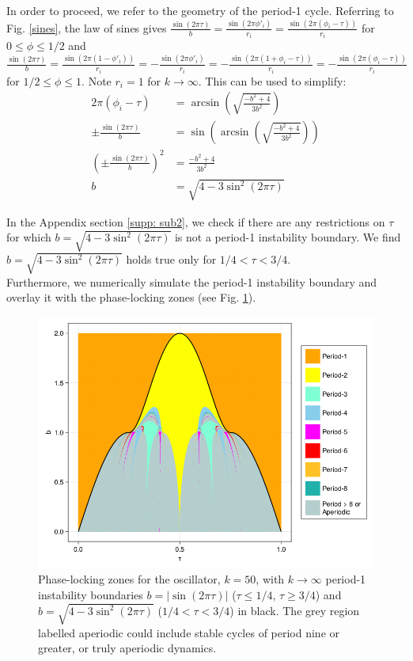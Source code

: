 \indent In order to proceed, we refer to the geometry of the period-1 cycle. Referring to Fig. \ref{sines}, the law of sines gives $\frac{\sin(2\pi \tau)}{b}=\frac{\sin(2\pi \phi'_i)}{r_i}=\frac{\sin(2\pi (\phi_i -\tau))}{r_i}$ for $0\leq \phi \leq1/2$ and $\frac{\sin(2\pi \tau)}{b}=\frac{\sin(2\pi (1-\phi'_i))}{r_i}=-\frac{\sin(2\pi \phi'_i)}{r_i}=-\frac{\sin(2\pi (1+\phi_i-\tau))}{r_i}=-\frac{\sin(2\pi (\phi_i-\tau))}{r_i}$ for $1/2\leq \phi \leq1$. Note $r_i=1$ for $k\rightarrow \infty$. This can be used to simplify:
\begin{align}
    2\pi(\phi_i - \tau) &= \arcsin(\sqrt{\frac{-b^2+4}{3b^2}}) \nonumber \\
    \pm\frac{\sin(2\pi \tau)}{b} &= \sin(\arcsin(\sqrt{\frac{-b^2+4}{3b^2}}))\nonumber \\
    (\pm\frac{\sin(2\pi \tau)}{b})^2 &= \frac{-b^2+4}{3b^2} \nonumber \\
    b &= \sqrt{4-3\sin^2(2\pi\tau)} 
    \label{eq:bound2}
\end{align}

In the Appendix section \ref{supp: sub2}, we check if there are any restrictions on $\tau$ for which $b = \sqrt{4-3\sin^2(2\pi\tau)}$ is not a period-1 instability boundary. We find $b = \sqrt{4-3\sin^2(2\pi\tau)}$ holds true only for $1/4<\tau<3/4$.\\

Furthermore, we numerically simulate the period-1 instability boundary and overlay it with the phase-locking zones (see Fig. \ref{p1-instab}). 

\begin{figure}[H]
    \begin{center}
    \includegraphics[width=.8\textwidth]{figures/big_plot_w_line.png}
    \end{center}
    \caption{Phase-locking zones for the oscillator, $k=50$, with $k\rightarrow \infty$ period-1 instability boundaries $b = |\sin(2\pi\tau)|$ ($\tau \leq 1/4$, $\tau \geq 3/4$) and $b = \sqrt{4-3\sin^2(2\pi\tau)}$ ($1/4<\tau<3/4$) in black. The grey region labelled aperiodic could include stable cycles of period nine or greater, or truly aperiodic dynamics.}
    \label{p1-instab}
\end{figure}

